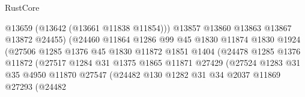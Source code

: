 \begin{lexlean}{RustCore}
\begin{coremodule}
                                          @13659
                                          (@13642 (@13661 @11838 @11854)))
                                        @13857
                                        @13860
                                        @13863
                                        @13867
                                        @13872
                                        @24455)
                                      (@24460
                                        @11864
                                        @1286
                                        @99
                                        @45
                                        @1830
                                        @11874
                                        @1830
                                        @1924
                                        (@27506
                                          @1285
                                          @1376
                                          @45
                                          @1830
                                          @11872
                                          @1851
                                          @1404
                                          (@24478
                                            @1285
                                            @1376
                                            @11872
                                            (@27517
                                              @1284
                                              @31
                                              @1375
                                              @1865
                                              @11871
                                              @27429
                                              (@27524
                                                @1283
                                                @31
                                                @35
                                                @4950
                                                @11870
                                                @27547
                                                (@24482
                                                  @130
                                                  @1282
                                                  @31
                                                  @34
                                                  @2037
                                                  @11869
                                                  @27293
                                                  (@24482

\end{coremodule}
\end{lexlean}
